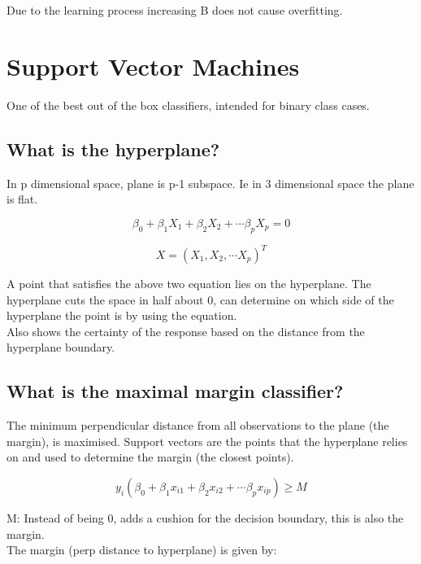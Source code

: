 \documentclass[11pt]{scrartcl} %
\begin{document}
Due to the learning process increasing B does not cause overfitting.

\section{Support Vector Machines}

One of the best out of the box classifiers, intended for binary class cases.

\subsection{What is the hyperplane?}

In p dimensional space, plane is p-1 subspace. Ie in 3 dimensional space the plane is flat.

\begin{equation}
	\beta_0 + \beta_1X_1 + \beta_2X_2 + \cdots \beta_pX_p = 0
\end{equation}

\begin{equation}
	X = (X_1,X_2,\cdots X_p)^T
\end{equation}

A point that satisfies the above two equation lies on the hyperplane. The hyperplane cuts the space
in half about 0, can determine on which side of the hyperplane the point is by using the equation.\\

Also shows the certainty of the response based on the distance from the hyperplane boundary.

\subsection{What is the maximal margin classifier?}

The minimum perpendicular distance from all observations to the plane (the margin), is maximised. Support vectors
are the points that the hyperplane relies on and used to determine the margin (the closest points).

\begin{equation}
	y_i(\beta_0+\beta_1x_{i1}+\beta_2x_{i2}+\cdots \beta_px_{ip}) \geq M
\end{equation}

M: Instead of being 0, adds a cushion for the decision boundary, this is also the margin.\\

The margin (perp distance to hyperplane) is given by:
\end{document}
